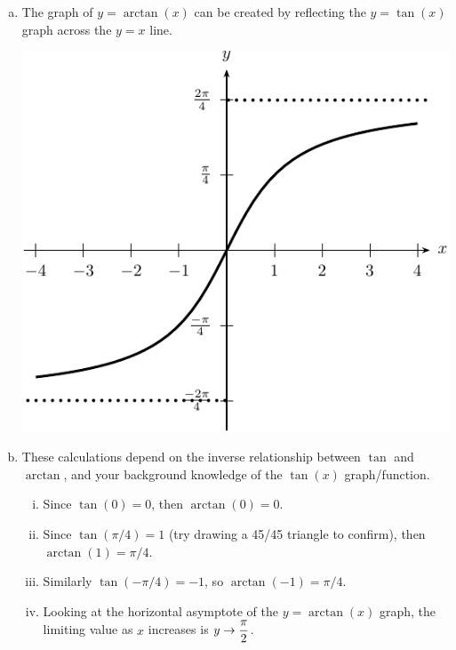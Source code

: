 \begin{enumerate}[1.]
\begin{multicols}{2}
\begin{Solution}
  \begin{enumerate}[(a)]
  \item The graph of $y = \arctan(x)$ can be created by reflecting
the $y = \tan(x)$ graph across the $y = x$ line. 
\begin{center}
\includegraphics[width=0.8\linewidth]{graphics/Week01_InverseTrig/arctan}
\end{center}
\item These calculations depend on the inverse relationship between
  $\tan$ and $\arctan$, and your background knowledge of the $\tan(x)$
  graph/function.
\begin{enumerate}[(i)]
\item Since $\tan(0) = 0$, then $\arctan(0) = 0$.
\item Since $\tan(\pi/4) = 1$ (try drawing a 45/45 triangle to
  confirm), then $\arctan(1) = \pi/4$.
\item Similarly $\tan(-\pi/4) = -1$, so $\arctan(-1) = \pi/4$.
\item Looking at the horizontal asymptote of the $y = \arctan(x)$
  graph, the limiting value as $x$ increases is $\displaystyle y \to
  \frac{\pi}{2}$.
\end{enumerate}
  \end{enumerate}
\end{Solution}
\end{multicols}
\end{enumerate}

